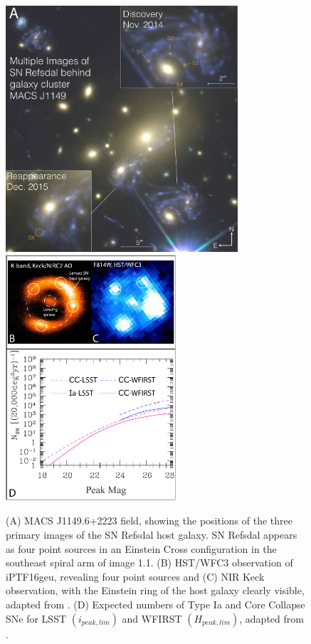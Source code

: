 \begin{figure}[b]
\centering
\includegraphics[height=3.6in]{FIG/refsdal_summary2}
\includegraphics[height=3.6in]{FIG/lensed3}
\caption{
(A) MACS J1149.6+2223 field, showing the positions of the three primary
images of the SN Refsdal host galaxy. SN
Refsdal appears as four point sources in an Einstein Cross
configuration in the southeast spiral arm of image 1.1. (B) HST/WFC3 observation
of iPTF16geu, revealing four point sources and (C) NIR Keck observation, with the 
Einstein ring of the host galaxy clearly visible, adapted from \citet{Goobar:2016}. (D)
Expected numbers of Type Ia and Core Collapse SNe for LSST $(i_{peak,lim})$ and 
WFIRST $(H_{peak,lim})$, adapted from \citet{Oguri:2010a}.}
\end{figure}%

